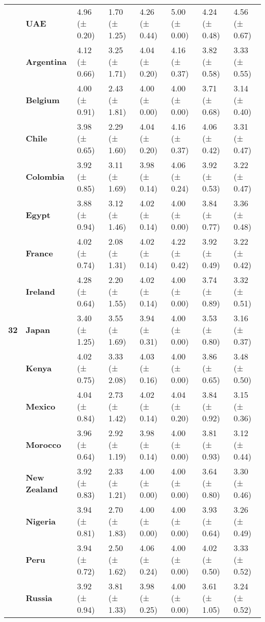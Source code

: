 \begin{longtable}{llllllll}
\textbf{} & \textbf{UAE} & 4.96 (± 0.20) & 1.70 (± 1.25) & 4.26 (± 0.44) & 5.00 (± 0.00) & 4.24 (± 0.48) & 4.56 (± 0.67) \\
\cline{1-8}
\multirow[t]{19}{*}{\textbf{32}} & \textbf{Argentina} & 4.12 (± 0.66) & 3.25 (± 1.71) & 4.04 (± 0.20) & 4.16 (± 0.37) & 3.82 (± 0.58) & 3.33 (± 0.55) \\
\textbf{} & \textbf{Belgium} & 4.00 (± 0.91) & 2.43 (± 1.81) & 4.00 (± 0.00) & 4.00 (± 0.00) & 3.71 (± 0.68) & 3.14 (± 0.40) \\
\textbf{} & \textbf{Chile} & 3.98 (± 0.65) & 2.29 (± 1.60) & 4.04 (± 0.20) & 4.16 (± 0.37) & 4.06 (± 0.42) & 3.31 (± 0.47) \\
\textbf{} & \textbf{Colombia} & 3.92 (± 0.85) & 3.11 (± 1.69) & 3.98 (± 0.14) & 4.06 (± 0.24) & 3.92 (± 0.53) & 3.22 (± 0.47) \\
\textbf{} & \textbf{Egypt} & 3.88 (± 0.94) & 3.12 (± 1.46) & 4.02 (± 0.14) & 4.00 (± 0.00) & 3.84 (± 0.77) & 3.36 (± 0.48) \\
\textbf{} & \textbf{France} & 4.02 (± 0.74) & 2.08 (± 1.31) & 4.02 (± 0.14) & 4.22 (± 0.42) & 3.92 (± 0.49) & 3.22 (± 0.42) \\
\textbf{} & \textbf{Ireland} & 4.28 (± 0.64) & 2.20 (± 1.55) & 4.02 (± 0.14) & 4.00 (± 0.00) & 3.74 (± 0.89) & 3.32 (± 0.51) \\
\textbf{} & \textbf{Japan} & 3.40 (± 1.25) & 3.55 (± 1.69) & 3.94 (± 0.31) & 4.00 (± 0.00) & 3.53 (± 0.80) & 3.16 (± 0.37) \\
\textbf{} & \textbf{Kenya} & 4.02 (± 0.75) & 3.33 (± 2.08) & 4.03 (± 0.16) & 4.00 (± 0.00) & 3.86 (± 0.65) & 3.48 (± 0.50) \\
\textbf{} & \textbf{Mexico} & 4.04 (± 0.84) & 2.73 (± 1.42) & 4.02 (± 0.14) & 4.04 (± 0.20) & 3.84 (± 0.92) & 3.15 (± 0.36) \\
\textbf{} & \textbf{Morocco} & 3.96 (± 0.64) & 2.92 (± 1.19) & 3.98 (± 0.14) & 4.00 (± 0.00) & 3.81 (± 0.93) & 3.12 (± 0.44) \\
\textbf{} & \textbf{New Zealand} & 3.92 (± 0.83) & 2.33 (± 1.21) & 4.00 (± 0.00) & 4.00 (± 0.00) & 3.64 (± 0.80) & 3.30 (± 0.46) \\
\textbf{} & \textbf{Nigeria} & 3.94 (± 0.81) & 2.70 (± 1.83) & 4.00 (± 0.00) & 4.00 (± 0.00) & 3.93 (± 0.64) & 3.26 (± 0.49) \\
\textbf{} & \textbf{Peru} & 3.94 (± 0.72) & 2.50 (± 1.62) & 4.06 (± 0.24) & 4.00 (± 0.00) & 4.02 (± 0.50) & 3.33 (± 0.52) \\
\textbf{} & \textbf{Russia} & 3.92 (± 0.94) & 3.81 (± 1.33) & 3.98 (± 0.25) & 4.00 (± 0.00) & 3.61 (± 1.05) & 3.24 (± 0.52) \\

\end{longtable}
